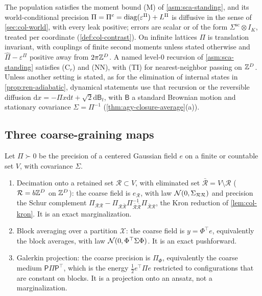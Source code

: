 \begin{assumption}\label{asm:ren-standing}
The population satisfies the moment bound \textup{(M)} of \cref{asm:sca-standing}, and its world-conditional precision $\Pi=\Pi^c=\operatorname{diag}(\varepsilon^\Pi)+L^\Pi$ is diffusive in the sense of \cref{sec:col-world}, with every leak positive; errors are scalar or of the form $\Sigma^{\mathrm{sc}}\otimes I_K$, treated per coordinate (\cref{def:col-contrast}). On infinite lattices $\Pi$ is translation invariant, with couplings of finite second moments unless stated otherwise and $\hat\Pi-\varepsilon^\Pi$ positive away from $2\pi\mathbb{Z}^D$. A named level-0 recursion of \cref{asm:sca-standing} satisfies \textup{(C$_r$)} and \textup{(NN)}, with \textup{(TI)} for nearest-neighbor passing on $\mathbb{Z}^D$. Unless another setting is stated, as for the elimination of internal states in \cref{prop:ren-adiabatic}, dynamical statements use that recursion or the reversible diffusion $\mathrm dx=-\Pi x\mathrm dt+\sqrt2\mathrm d\mathsf B_t$, with $\mathsf B$ a standard Brownian motion and stationary covariance $\Sigma=\Pi^{-1}$ (\cref{thm:agy-closure-average}(a)).
\end{assumption}

\subsection{Three coarse-graining maps}\label{sec:ren-maps}

\begin{definition}\label{def:ren-maps}
Let $\Pi\succ0$ be the precision of a centered Gaussian field $e$ on a finite or countable set $V$, with covariance $\Sigma$.
\begin{enumerate}
\item[(a)] Decimation onto a retained set $\mathcal R\subset V$, with eliminated set $\bar{\mathcal R}=V\setminus\mathcal R$ ($\mathcal R=b\mathbb{Z}^D$ on $\mathbb{Z}^D$): the coarse field is $e_{\mathcal R}$, with law $\mathcal{N}(0,\Sigma_{\mathcal R\mathcal R})$ and precision the Schur complement $\Pi_{\mathcal R\mathcal R}-\Pi_{\mathcal R\bar{\mathcal R}}\Pi_{\bar{\mathcal R}\bar{\mathcal R}}^{-1}\Pi_{\bar{\mathcal R}\mathcal R}$, the Kron reduction of \cref{lem:col-kron}. It is an exact marginalization.
\item[(b)] Block averaging over a partition $\mathcal X$: the coarse field is $y=\Phi^\top e$, equivalently the block averages, with law $\mathcal{N}(0,\Phi^\top\Sigma\Phi)$. It is an exact pushforward.
\item[(c)] Galerkin projection: the coarse precision is $\Pi_\Phi$, equivalently the coarse medium $\mathsf P\Pi\mathsf P^\top$, which is the energy $\frac12e^\top\Pi e$ restricted to configurations that are constant on blocks. It is a projection onto an ansatz, not a marginalization.
\end{enumerate}
\end{definition}

